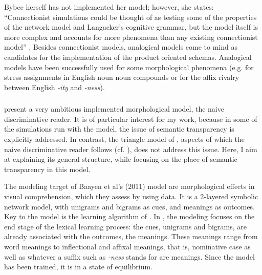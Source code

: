 Bybee herself has not implemented her model; however, she 
states: ``Connectionist simulations could be thought of as testing
some of the properties of the network model and Langacker's cognitive
grammar, but the model itself is more complex and accounts for more
phenomena than any existing connectionist model''
\citep[428]{Bybee:1995}. Besides connectionist models, analogical
models come to mind as candidates for the implementation of the
product oriented schemas. Analogical models have been successfully used for some morphological phenomena (e.g. \citealt{Arndt-Lappe:2011} for stress assignments in English noun noun compounds or \citealt{Arndt-Lappe:2014} for the affix rivalry between English \emph{-ity} and \emph{-ness}).

\subsubsection{\citet{Baayenetal:2011}}
\label{sec:baayen2011}

\citet{Baayenetal:2011} present a very ambitious implemented
morphological model, the naive discriminative reader. It is of particular interest for my work, because
in some of the simulations run with the model, the issue of semantic
transparency is explicitly addressed. In contrast, the triangle model of
\citet{HarmandSeidenberg:2004}, aspects of which the naive
discriminative reader follows (cf. \citealt[439--440]{Baayenetal:2011}), does not address this
issue. Here, I aim at explaining its general structure, while
focusing on the place of semantic transparency in this model. 

The modeling target of Baayen et al's (2011) model are morphological effects in
visual comprehension, which they assess by using  data.
It is a 2-layered symbolic network model, with unigrams and bigrams
as cues, and meanings as outcomes. Key to the model is the learning algorithm of
\citet{WagnerandRescorla:1972}. 
In \citet{Baayenetal:2011}, the modeling focuses on the end stage of the
lexical 
learning process: the cues, unigrams and bigrams, are already
associated with the outcomes, the meanings. These meanings range from word meanings
to inflectional and affixal meanings, that is, nominative case as well
as whatever a suffix such as \emph{-ness} stands for are meanings. Since the model has been
trained, it 
is in a state of equilibrium. 

